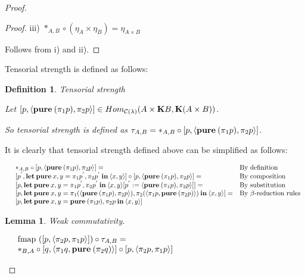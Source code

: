 \documentclass[a4paper]{article}
\newtheorem{lemma}{Lemma}
\newtheorem{defin}{Definition}
\begin{document}
\begin{proof}
\begin{proof}
iii) $\ast_{A,B} \circ (\eta_{A} \times \eta_{B}) = \eta_{A \times B}$

Follows from i) and ii).

\end{proof}

  Tensorial strength is defined as follows:

\begin{defin} Tensorial strength
  $ $

  Let $[p, \langle {\bf pure \:} (\pi_1 p), \pi_2 p \rangle] \in Hom_{\mathcal{C}(\lambda)}(A \times {\bf K}B, {\bf K}(A \times B))$.

  So tensorial strength is defined as $\tau_{A, B} = \ast_{A, B} \circ [p, \langle {\bf pure \:} (\pi_1 p), \pi_2 p \rangle]$.
\end{defin}

It is clearly that tensorial strength defined above can be simplified as follows:

$\begin{array}{lll}
&\ast_{A, B} \circ [p, \langle {\bf pure \:} (\pi_1 p), \pi_2 p \rangle] = & \text{By definition} \\
&[p^{'}, {\bf let \: pure \:} x, y = \pi_1 p^{'}, \pi_2 p^{'} {\: \bf in \:} \langle x, y \rangle] \circ [p, \langle {\bf pure \:} (\pi_1 p), \pi_2 p \rangle] = & \text{By composition} \\
&[p, {\bf let \: pure \:} x, y = \pi_1 p^{'}, \pi_2 p^{'} {\: \bf in \:} \langle x, y \rangle [p^{'} := \langle {\bf pure \:} (\pi_1 p), \pi_2 p \rangle]] = & \text{By substitution} \\
&[p, {\bf let \: pure \:} x, y = \pi_1 (\langle {\bf pure \:} (\pi_1 p), \pi_2 p \rangle), \pi_2 (\langle \pi_1 p, {\bf pure \:} (\pi_2 p) \rangle) {\: \bf in \:} \langle x, y \rangle] = & \text{By $\beta$-reduction rules} \\
&[p, {\bf let \: pure \:} x, y = {\bf pure \:} (\pi_1 p), \pi_2 p {\: \bf in \:} \langle x, y \rangle]&
\end{array}$



\begin{lemma} Weak commutativity.
  $ $

  $\begin{array}{lll}
  & \text{fmap } ([p, \langle \pi_2 p, \pi_1 p \rangle]) \circ \tau_{A,B} = & \\
  & \ast_{B, A} \circ [q, \langle \pi_1 q, {\bf pure \:} (\pi_2 q) \rangle] \circ [p, \langle \pi_2 p, \pi_1 p \rangle]&
  \end{array}$
\end{lemma}


\end{proof}
\end{document}
